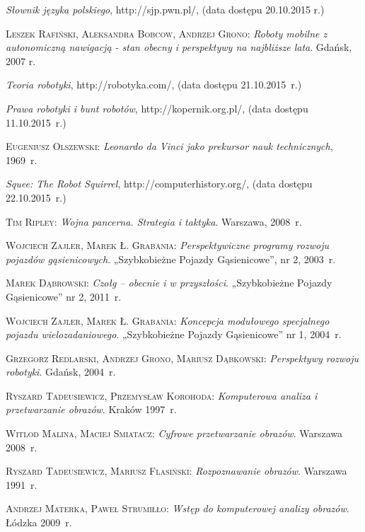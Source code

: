 \begin{thebibliography}{9}
\emph{Słownik języka polskiego}, http://sjp.pwn.pl/, (data dostępu 20.10.2015 r.)

\textsc{Leszek Rafiński, Aleksandra Bobcow, Andrzej Grono}: \emph{Roboty mobilne z autonomiczną nawigacją - stan obecny i perspektywy na najbliższe lata}. Gdańsk, 2007 r.  

\emph{Teoria robotyki}, http://robotyka.com/, (data dostępu 21.10.2015~r.)

\emph{Prawa robotyki i bunt robotów}, http://kopernik.org.pl/, (data dostępu 11.10.2015~r.)

\textsc{Eugeniusz Olszewski}: \emph{Leonardo da Vinci jako prekursor nauk technicznych}, 1969~r.

\emph{Squee: The Robot Squirrel}, http://computerhistory.org/, (data dostępu 22.10.2015~r.)

\textsc{Tim Ripley}: \emph{Wojna pancerna. Strategia i taktyka}. Warszawa, 2008~r.

\textsc{Wojciech Zajler, Marek Ł. Grabania}: \emph{Perspektywiczne programy rozwoju pojazdów gąsienicowych}. „Szybkobieżne Pojazdy Gąsienicowe”, nr 2, 2003~r.

\textsc{Marek Dąbrowski}: \emph{Czołg – obecnie i w przyszłości}. „Szybkobieżne Pojazdy Gąsienicowe” nr 2, 2011~r.

\textsc{Wojciech Zajler, Marek Ł. Grabania}: \emph{Koncepcja modułowego specjalnego pojazdu wielozadaniowego}. „Szybkobieżne Pojazdy Gąsienicowe” nr 1, 2004~r.

\textsc{Grzegorz Redlarski, Andrzej Grono, Mariusz Dąbkowski}: \emph{Perspektywy rozwoju robotyki}. Gdańsk, 2004~r.

\textsc{Ryszard Tadeusiewicz, Przemysław Korohoda}: \emph{Komputerowa analiza i przetwarzanie obrazów}. Kraków 1997~r.

\textsc{Witlod Malina, Maciej Smiatacz}: \emph{Cyfrowe przetwarzanie obrazów}. Warszawa 2008~r.

\textsc{Ryszard Tadeusiewicz, Mariusz Flasiński}: \emph{Rozpoznawanie obrazów}. Warszawa 1991~r.

\textsc{Andrzej Materka, Paweł Strumiłło}: \emph{Wstęp do komputerowej analizy obrazów}. Łódzka 2009~r.

\end{thebibliography}
